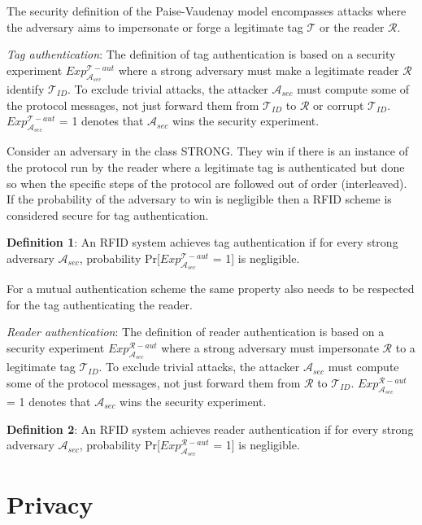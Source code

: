     The security definition of the Paise-Vaudenay model \cite{PV model} encompasses attacks where the adversary aims to impersonate or 
    forge a legitimate tag $\mathcal{T}$ or the reader $\mathcal{R}$.

    \textit{Tag authentication}: The definition of tag authentication is based on a security experiment $Exp_{\mathcal{A}_{sec}}^{\mathcal{T}-aut}$
    where a strong adversary must make a legitimate reader $\mathcal{R}$ identify $\mathcal{T}_{ID}$. To exclude trivial attacks, the attacker $\mathcal{A}_{sec}$
    must compute some of the protocol messages, not just forward them from $\mathcal{T}_{ID}$ to $\mathcal{R}$ or corrupt $\mathcal{T}_{ID}$. $Exp_{\mathcal{A}_{sec}}^{\mathcal{T}-aut}$ = 1
    denotes that $\mathcal{A}_{sec}$ wins the security experiment.

    Consider an adversary in the class STRONG. They win if there is an instance of the protocol run
    by the reader where a legitimate tag is authenticated but done so when the specific steps of the 
    protocol are followed out of order (interleaved). If the probability of the adversary to win is 
    negligible then a RFID scheme is considered secure for tag authentication.

    \textbf{Definition 1}: An RFID system achieves tag authentication if for every strong adversary $\mathcal{A}_{sec}$, probability 
    Pr[$Exp_{\mathcal{A}_{sec}}^{\mathcal{T}-aut}$ = 1] is negligible.

    For a mutual authentication scheme the same property also needs to be respected for the tag authenticating
    the reader.

    \textit{Reader authentication}: The definition of reader authentication is based on a security experiment $Exp_{\mathcal{A}_{sec}}^{\mathcal{R}-aut}$
    where a strong adversary must impersonate $\mathcal{R}$ to a legitimate tag $\mathcal{T}_{ID}$. To exclude trivial attacks, the attacker $\mathcal{A}_{sec}$
    must compute some of the protocol messages, not just forward them from $\mathcal{R}$ to $\mathcal{T}_{ID}$. $Exp_{\mathcal{A}_{sec}}^{\mathcal{R}-aut}$ = 1
    denotes that $\mathcal{A}_{sec}$ wins the security experiment.

    \textbf{Definition 2}: An RFID system achieves reader authentication if for every strong adversary $\mathcal{A}_{sec}$, probability 
    Pr[$Exp_{\mathcal{A}_{sec}}^{\mathcal{R}-aut}$ = 1] is negligible.

    \section{Privacy}

